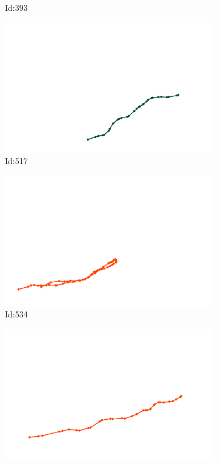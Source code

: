 \documentclass[12pt,twoside]{report}
\begin{document}
\begin{figure}
\begin{subfigure}[b]{0.20\textwidth}
\caption{Id:393}
\end{subfigure}
\begin{subfigure}[b]{0.20\textwidth}
\centering
\includegraphics[width=\textwidth]{../trajectories/517.png}
\caption{Id:517}
\end{subfigure}
\begin{subfigure}[b]{0.20\textwidth}
\centering
\includegraphics[width=\textwidth]{../trajectories/534.png}
\caption{Id:534}
\end{subfigure}
\begin{subfigure}[b]{0.20\textwidth}
\centering
\includegraphics[width=\textwidth]{../trajectories/737.png}

\end{subfigure}
\end{figure}
\end{document}
